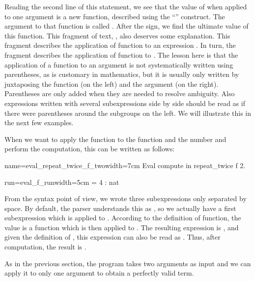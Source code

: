 Reading the second line of this statement, we see that the value
of  when applied to one argument is a new
function, described using the ``'' construct.  The
argument to that function is called .  After the \C{=>} sign, we
find the ultimate value of this function.  This fragment of text, , also deserves some explanation.  This fragment describes the
application of function  to an expression .  In turn,
the fragment  describes the application of function  to
.  The lesson here is that the application of a function to an
argument is not systematically written using parentheses, as is
customary in mathematics, but it is usually only written by
juxtaposing the function (on the left) and the argument (on the
right).  Parentheses are only added when they are needed to resolve
ambiguity.  Also expressions written with several subexpressions side
by side should be read as if there were parentheses around the
subgroups on the left.  We will illustrate this in the next few
examples.

When we want to apply the function  to the function
 and the number  and perform the computation, this can be
written as follows:

\begin{coq}{name=eval_repeat_twice_f_two}{width=7cm}
Eval compute in repeat_twice f 2.
\end{coq}
\begin{coqout}{run=eval_f_run}{width=5cm}
= 4 : nat
\end{coqout}
From the syntax point of view, we wrote three subexpressions only
separated by space.  By default, the parser understands this as
, so we actually have a first subexpression
which is  applied to .  According to the
definition of  function, the value is 
a function 
which is then applied to . 
The resulting expression is , and given the
definition of , this expression can also
be read as .  Thus, after computation, the result is .

As in the previous section, 
the  program takes two arguments as input and we can
apply it to only one argument to obtain a perfectly valid term.

